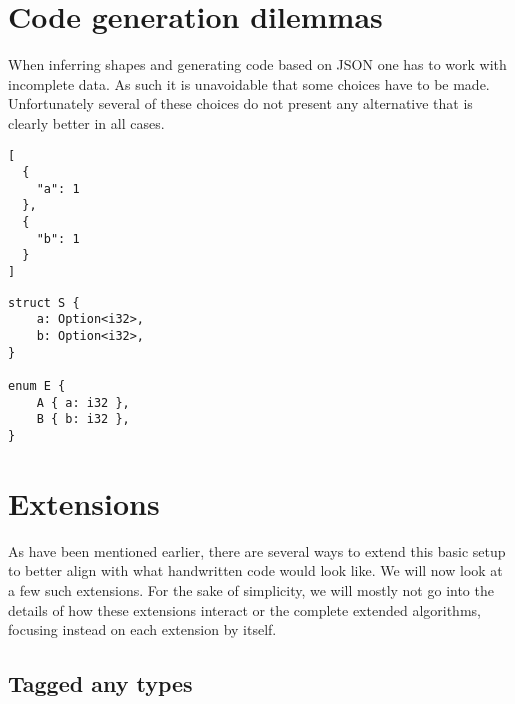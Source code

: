 \section{Code generation dilemmas}
\label{sec:design-considerations}

When inferring shapes and generating code based on JSON one has to work with incomplete data. As such it is unavoidable that some choices have to be made. Unfortunately several of these choices do not present any alternative that is clearly better in all cases.




\begin{listing}[ht!]
\begin{verbatim}
[
  {
    "a": 1
  },
  {
    "b": 1
  }
]
\end{verbatim}
\caption{JSON Dilemma \#1}
\label{lst:json-dilemma-1}
\end{listing}

\begin{listing}[ht!]
\begin{verbatim}
struct S {
    a: Option<i32>,
    b: Option<i32>,
}

enum E {
    A { a: i32 },
    B { b: i32 },
}
\end{verbatim}
\caption{JSON Dilemma \#1 - Two solutions}
\label{lst:json-dilemma-1-rs}
\end{listing}

\section{Extensions}
\label{sec:extensions}

As have been mentioned earlier, there are several ways to extend this basic setup to better align with what handwritten code would look like. We will now look at a few such extensions. For the sake of simplicity, we will mostly not go into the details of how these extensions interact or the complete extended algorithms, focusing instead on each extension by itself.

\subsection{Tagged any types}
\label{sec:tagged-any}


